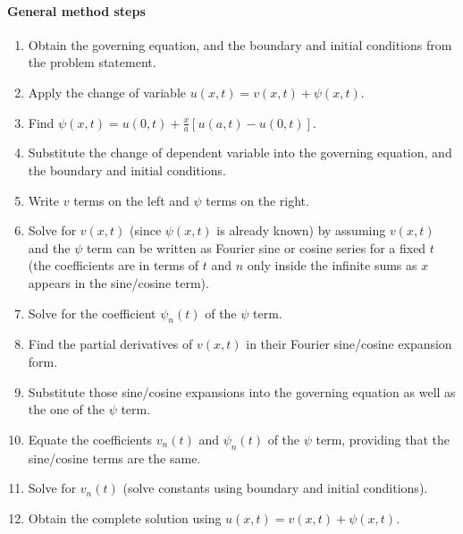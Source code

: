 \documentclass[10pt, twocolumn]{article}
\begin{document}
\paragraph{General method steps}
\begin{enumerate}
  \item Obtain the governing equation, and the boundary and initial conditions from the problem statement.
  \item Apply the change of variable \(u(x,t) = v(x,t) + \psi(x,t)\).
  \item Find \(\psi(x,t) = u(0,t) + \frac{x}{a} \left[ u(a,t) - u(0,t) \right]\).
  \item Substitute the change of dependent variable into the governing equation, and the boundary and initial conditions.
  \item Write \(v\) terms on the left and \(\psi\) terms on the right.
  \item Solve for \(v(x,t)\) (since \(\psi(x,t)\) is already known) by assuming \(v(x,t)\) and the \(\psi\) term can be written as Fourier sine or cosine series for a fixed \(t\) (the coefficients are in terms of \(t\) and \(n\) only inside the infinite sums as \(x\) appears in the sine/cosine term).
  \item Solve for the coefficient \(\psi_n(t)\) of the \(\psi\) term.
  \item Find the partial derivatives of \(v(x,t)\) in their Fourier sine/cosine expansion form.
  \item Substitute those sine/cosine expansions into the governing equation as well as the one of the \(\psi\) term.
  \item Equate the coefficients \(v_n(t)\) and \(\psi_n(t)\) of the \(\psi\) term, providing that the sine/cosine terms are the same.
  \item Solve for \(v_n(t)\) (solve constants using boundary and initial conditions).
  \item Obtain the complete solution using \(u(x,t) = v(x,t) + \psi(x,t)\).
\end{enumerate}
\end{document}
